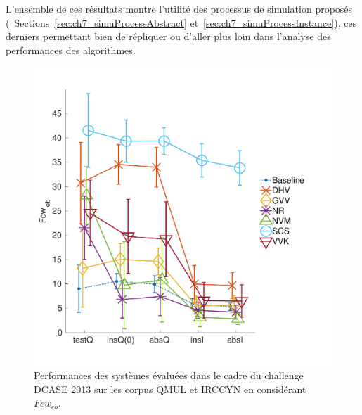 L'ensemble de ces résultats montre l'utilité des processus de simulation proposés (\cf~Sections~\ref{sec:ch7_simuProcessAbstract} et~\ref{sec:ch7_simuProcessInstance}), ces derniers permettant bien de répliquer ou d'aller plus loin dans l'analyse des performances des algorithmes.

\begin{figure}[t]
\includegraphics[width=1\columnwidth]{gfx/ch_7/dcase2013_1}
\caption{Performances des systèmes évaluées dans le cadre du challenge DCASE 2013 sur les corpus QMUL et IRCCYN en considérant $Fcw_{eb}$.}
\label{fig:irccyn}
\end{figure}

